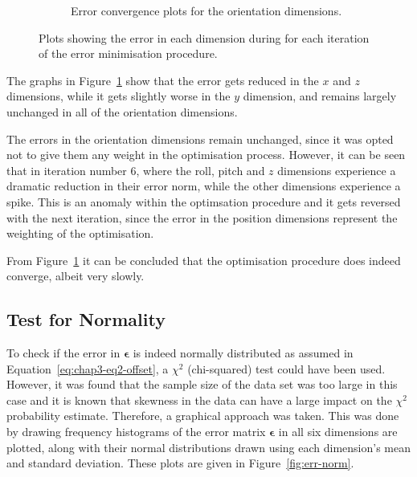 \begin{figure}
\begin{subfigure}{0.48\textwidth}
\begin{subfigure}{\textwidth}
    \end{subfigure}
    \caption{Error convergence plots for the orientation dimensions.}
  \end{subfigure}
  \caption[Plots showing error convergence for the optimsation procedure.]{Plots showing the error in each dimension during for each iteration of the error minimisation procedure.}
  \label{fig:err-convergence}
\end{figure}

The graphs in Figure~\ref{fig:err-convergence} show that the error gets reduced in the $x$ and $z$ dimensions, while it gets slightly worse in the $y$ dimension, and remains largely unchanged in all of the orientation dimensions. 

The errors in the orientation dimensions remain unchanged, since it was opted not to give them any weight in the optimisation process. However, it can be seen that in iteration number 6, where the roll, pitch and $z$ dimensions experience a dramatic reduction in their error norm, while the other dimensions experience a spike. This is an anomaly within the optimsation procedure and it gets reversed with the next iteration, since the error in the position dimensions represent the weighting of the optimisation. 

From Figure~\ref{fig:err-convergence} it can be concluded that the optimisation procedure does indeed converge, albeit very slowly. 

\subsection{Test for Normality}
\label{sec:err-norm-test}

To check if the error in $\bm{\epsilon}$ is indeed normally distributed as assumed in Equation~\ref{eq:chap3-eq2-offset}, a $\chi^2$ (chi-squared) test could have been used. However, it was found that the sample size of the data set was too large in this case and it is known that skewness in the data can have a large impact on the $\chi^2$ probability estimate. Therefore, a graphical approach was taken. This was done by drawing frequency histograms of the error matrix $\bm{\epsilon}$ in all six dimensions are plotted, along with their normal distributions drawn using each dimension's mean and standard deviation. These plots are given in Figure~\ref{fig:err-norm}.

